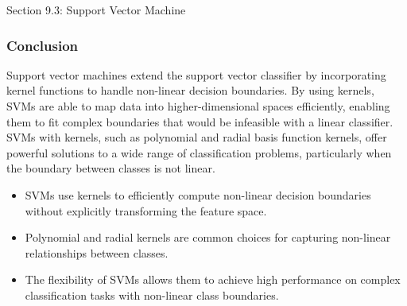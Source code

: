 \begin{notes}{Section 9.3: Support Vector Machine}
    \subsubsection*{Conclusion}
    
    Support vector machines extend the support vector classifier by incorporating kernel functions to handle non-linear decision boundaries. By using kernels, SVMs are able to map data into higher-dimensional 
    spaces efficiently, enabling them to fit complex boundaries that would be infeasible with a linear classifier. SVMs with kernels, such as polynomial and radial basis function kernels, offer powerful solutions 
    to a wide range of classification problems, particularly when the boundary between classes is not linear.
    
    \begin{highlight}
        \begin{itemize}
            \item SVMs use kernels to efficiently compute non-linear decision boundaries without explicitly transforming the feature space.
            \item Polynomial and radial kernels are common choices for capturing non-linear relationships between classes.
            \item The flexibility of SVMs allows them to achieve high performance on complex classification tasks with non-linear class boundaries.
        \end{itemize}
    \end{highlight}
\end{notes}